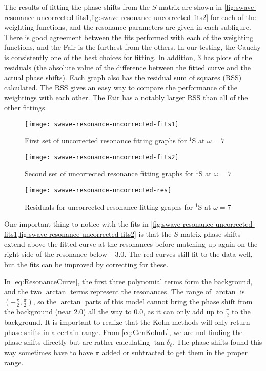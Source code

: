 \documentclass[Dissertation.tex]{subfiles}
\begin{document}
The results of fitting the phase shifts from the $S$ matrix are shown in
\cref{fig:swave-resonance-uncorrected-fits1,fig:swave-resonance-uncorrected-fits2} 
for each of the weighting functions, and the resonance parameters are given 
in each subfigure. There is good agreement between the fits performed with 
each of the weighting functions, and the Fair is the furthest from the 
others. In our testing, the Cauchy is consistently one of the best choices 
for fitting. In addition, \cref{fig:swave-resonance-uncorrected-res} has 
plots of the residuals (the absolute value of the difference between the 
fitted curve and the actual phase shifts). Each graph also has the residual 
sum of squares (RSS) calculated. The RSS gives an easy way to compare the 
performance of the weightings with each other. The Fair has a notably larger 
RSS than all of the other fittings.

\begin{figure}[H]
	\centering
	\texttt{[image: swave-resonance-uncorrected-fits1]}
	\caption{First set of uncorrected resonance fitting graphs for $^1$S at $\omega = 7$}
	\label{fig:swave-resonance-uncorrected-fits1}
\end{figure}

\begin{figure}[H]
	\centering
	\texttt{[image: swave-resonance-uncorrected-fits2]}
	\caption{Second set of uncorrected resonance fitting graphs for $^1$S at $\omega = 7$}
	\label{fig:swave-resonance-uncorrected-fits2}
\end{figure}

\begin{figure}[H]
	\centering
	\texttt{[image: swave-resonance-uncorrected-res]}
	\caption{Residuals for uncorrected resonance fitting graphs for $^1$S at $\omega = 7$}
	\label{fig:swave-resonance-uncorrected-res}
\end{figure}

One important thing to notice with the fits in
\cref{fig:swave-resonance-uncorrected-fits1,fig:swave-resonance-uncorrected-fits2} is that the
$S$-matrix phase shifts extend above the fitted curve at the resonances before 
matching up again on the right side of the resonance below $-3.0$. The red 
curves still fit to the data well, but the fits can be improved by correcting 
for these. 

In \cref{eq:ResonanceCurve}, the first three polynomial terms form the 
background, and the two $\arctan$ terms represent the resonances. The range 
of $\arctan$ is $(-\frac{\pi}{2},\frac{\pi}{2})$, so the $\arctan$ parts of 
this model cannot bring the phase shift from the background (near 2.0) all 
the way to 0.0, as it can only add up to $\frac{\pi}{2}$ to the background. 
It is important to realize that the Kohn methods will only return phase 
shifts in a certain range. From \cref{eq:GenKohnL}, we are not finding the 
phase shifts directly but are rather calculating $\tan \delta_\ell$. The 
phase shifts found this way sometimes have to have $\pi$ added or subtracted 
to get them in the proper range.
\end{document}
